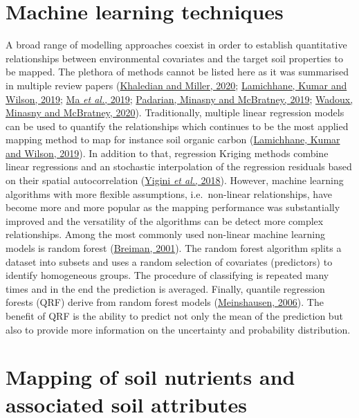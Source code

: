 \documentclass[
  10pt,
  b5paper,
  oneside]{book}
\begin{document}
\hypertarget{machine-learning-techniques}{%
\section{Machine learning techniques}\label{machine-learning-techniques}}

A broad range of modelling approaches coexist in order to establish quantitative relationships between environmental covariates and the target soil properties to be mapped. The plethora of methods cannot be listed here as it was summarised in multiple review papers (\protect\hyperlink{ref-khaledian2020}{Khaledian and Miller, 2020}; \protect\hyperlink{ref-lamichhane2019}{Lamichhane, Kumar and Wilson, 2019}; \protect\hyperlink{ref-ma2019}{Ma \emph{et al.}, 2019}; \protect\hyperlink{ref-padarian2019}{Padarian, Minasny and McBratney, 2019}; \protect\hyperlink{ref-wadoux2020}{Wadoux, Minasny and McBratney, 2020}).
Traditionally, multiple linear regression models can be used to quantify the relationships which continues to be the most applied mapping method to map for instance soil organic carbon (\protect\hyperlink{ref-lamichhane2019}{Lamichhane, Kumar and Wilson, 2019}). In addition to that, regression Kriging methods combine linear regressions and an stochastic interpolation of the regression residuals based on their spatial autocorrelation (\protect\hyperlink{ref-yigini2018}{Yigini \emph{et al.}, 2018}).
However, machine learning algorithms with more flexible assumptions, i.e.~non-linear relationships, have become more and more popular as the mapping performance was substantially improved and the versatility of the algorithms can be detect more complex relationships.
Among the most commonly used non-linear machine learning models is random forest (\protect\hyperlink{ref-Breiman2001}{Breiman, 2001}). The random forest algorithm splits a dataset into subsets and uses a random selection of covariates (predictors) to identify homogeneous groups. The procedure of classifying is repeated many times and in the end the prediction is averaged. Finally, quantile regression forests (QRF) derive from random forest models (\protect\hyperlink{ref-Meinshausen2006}{Meinshausen, 2006}). The benefit of QRF is the ability to predict not only the mean of the prediction but also to provide more information on the uncertainty and probability distribution.

\hypertarget{mapping-of-soil-nutrients-and-associated-soil-attributes}{%
\section{Mapping of soil nutrients and associated soil attributes}\label{mapping-of-soil-nutrients-and-associated-soil-attributes}}
\end{document}
